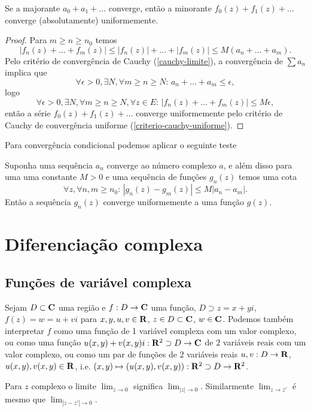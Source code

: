 \begin{prop}
\label{weierstrass-m}
Se a majorante $a_0 + a_1 + \dots$ converge,
então a minorante $f_0(z) + f_1(z) + \dots$ converge (absolutamente) uniformemente.
\end{prop}
\begin{proof}
Para $m\geq n\geq n_0$ temos
\[ |f_n(z) + \dots + f_m(z)| \leq |f_n(z)| + \dots + |f_m(z)| \leq  M(a_n + \dots + a_m). \]
Pelo critério de convergência de Cauchy (\cref{cauchy-limite}), a convergência de $\sum a_n$ implica que
\[ \forall \epsilon>0,\exists N,\forall m\geq n\geq N: \, a_n + \dots + a_m \leq \epsilon, \]
logo
\[ \forall \epsilon>0,\exists N,\forall m\geq n\geq N,\forall z\in E: \,
 |f_n(z) + \dots + f_m(z)| \leq M \epsilon, \]
então a série $f_0(z) + f_1(z) + \dots$ converge uniformemente pelo critério
de Cauchy de convergência uniforme (\cref{criterio-cauchy-uniforme}).
\end{proof}

Para convergência condicional podemos aplicar o seguinte teste
\begin{prop}
Suponha uma sequência $a_n$ converge ao número complexo $a$,
e além disso para uma uma constante $M>0$ e uma sequência de funções $g_n(z)$ temos uma cota
\[\forall z,\forall n,m\geq n_0:\,  |g_n(z) - g_m(z)| \leq M |a_n-a_m|. \]
Então a sequência $g_n(z)$ converge uniformemente a uma função $g(z)$.
\end{prop}

\section{Diferenciação complexa}

\subsection{Funções de variável complexa}

Sejam $D\subset \mathbf{C}$ uma região e $f : D \to \mathbf{C}$ uma função,
$D\supset z = x + yi$, $f(z) = w = u + v i$ para $x,y,u,v\in \mathbf{R}$, $z\in D\subset \mathbf{C}$, $w\in \mathbf{C}$.
Podemos também interpretar $f$ como uma função de 1 variável complexa com um valor complexo,
ou como uma função $u(x,y) + v(x,y) i : \mathbf{R}^2\supset D \to \mathbf{C}$ de $2$ variáveis reais com um valor complexo,
ou como um par de funções de $2$ variáveis reais
$u,v : D \to \mathbf{R}$, $u(x,y), v(x,y) \in \mathbf{R}$,
i.e. $(x,y) \mapsto (u(x,y),v(x,y)) : \mathbf{R}^2 \supset D \to \mathbf{R}^2$.

Para $z$ complexo o limite $\lim_{z\to 0}$ significa $\lim_{|z|\to 0}$.
Similarmente $\lim_{z\to z'}$ é mesmo que $\lim_{|z-z'|\to 0}$.

